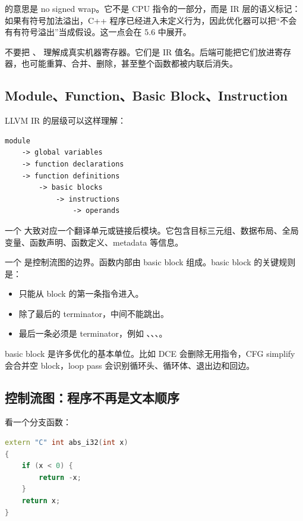  的意思是 no signed wrap。它不是 CPU 指令的一部分，而是 IR 层的语义标记：如果有符号加法溢出，C++ 程序已经进入未定义行为，因此优化器可以把“不会有有符号溢出”当成假设。这一点会在 5.6 中展开。

\begin{warningbox}
不要把 、 理解成真实机器寄存器。它们是 IR 值名。后端可能把它们放进寄存器，也可能重算、合并、删除，甚至整个函数都被内联后消失。
\end{warningbox}

\subsection{Module、Function、Basic Block、Instruction}

LLVM IR 的层级可以这样理解：

\begin{lstlisting}
module
    -> global variables
    -> function declarations
    -> function definitions
        -> basic blocks
            -> instructions
                -> operands
\end{lstlisting}

一个  大致对应一个翻译单元或链接后模块。它包含目标三元组、数据布局、全局变量、函数声明、函数定义、metadata 等信息。

一个  是控制流图的边界。函数内部由 basic block 组成。basic block 的关键规则是：

\begin{itemize}
  \item 只能从 block 的第一条指令进入。
  \item 除了最后的 terminator，中间不能跳出。
  \item 最后一条必须是 terminator，例如 、、、。
\end{itemize}

basic block 是许多优化的基本单位。比如 DCE 会删除无用指令，CFG simplify 会合并空 block，loop pass 会识别循环头、循环体、退出边和回边。

\subsection{控制流图：程序不再是文本顺序}

看一个分支函数：

\begin{lstlisting}[language=C++]
extern "C" int abs_i32(int x)
{
    if (x < 0) {
        return -x;
    }
    return x;
}
\end{lstlisting}


